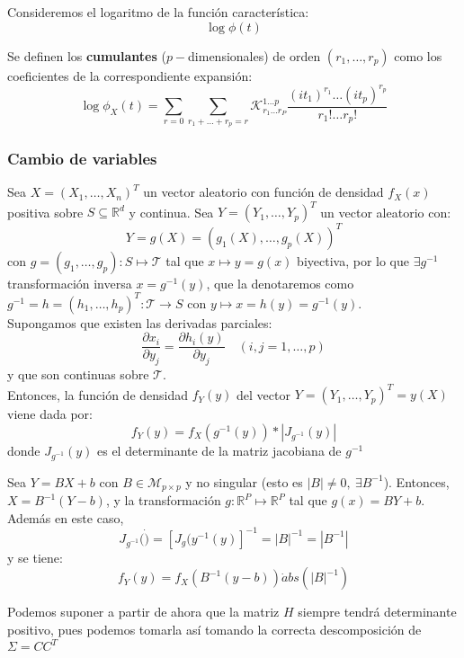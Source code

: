 Consideremos el logaritmo de la función característica:
\[
\log \phi(t)
\]
\begin{ndef}
  Se definen los \textbf{cumulantes} ($p-$dimensionales) de orden $(r_1 , \dots, r_p)$ como los coeficientes de la correspondiente expansión:
  \[
  \log \phi_X(t) =  \sum_{r= 0} \sum_{r_1+\dots + r_p = r} \mathcal K_{r_1 \dots r_P}^{1\dots p} \frac{(it_1)^{r_1} \dots (it_p)^{r_p}}{r_1 ! \dots r_p !}
  \]
\end{ndef}


\subsubsection{Cambio de variables}

\begin{nth}
  Sea $X = (X_1,\dots,X_n)^T$ un vector aleatorio con función de densidad $f_X(x)$ positiva sobre $S \subseteq \mathbb R^d$ y continua. Sea $Y = (Y_1,\dots,Y_p)^T$ un vector aleatorio con:
  \[
  Y = g(X) = (g_1(X),\dots ,g_p(X))^T
  \]
  con $g = (g_1,\dots,g_p): S \mapsto \mathcal T$ tal que $x\mapsto y=g(x)$ biyectiva, por lo que $\exists g^{-1}$ transformación inversa $x = g^{-1}(y)$, que la denotaremos como $g^{-1} = h = (h_1,\dots, h_p)^T : \mathcal T \to S$ con $y \mapsto x =h(y) = g^{-1}(y)$.\\

  Supongamos que existen las derivadas parciales:
  \[
  \frac{\partial x_i}{\partial y_j} = \frac{\partial h_i(y)}{\partial y_j} \quad (i,j = 1,\dots,p)
  \]
  y que son continuas sobre $\mathcal T$.\\

  Entonces, la función de densidad $f_Y(y)$ del vector $Y=(Y_1,\dots,Y_p)^T = y(X)$ viene dada por:
  \[
  f_Y(y) = f_X(g^{-1}(y))*|J_{g^{-1}}(y)|
  \]
  donde $J_{g^{-1}}(y)$ es el determinante de la matriz jacobiana de $g^{-1}$
\end{nth}

\begin{ncor}
  Sea $Y = BX + b$ con $B\in \mathcal M_{p\times p}$ y no singular (esto es $|B|\ne 0, \ \exists B^{-1}$). Entonces, $X = B^{-1}(Y-b)$, y la transformación $g: \mathbb R^P \mapsto \mathbb R^P$ tal que $g(x) = BY+b$. Además en este caso,
  \[
  J_{g^{-1}}(\dot) = [ J_{g}(y^{-1}(y)]^{-1} = |B|^{-1} = |B^{-1}|
  \]
  y se tiene:
  \[
  f_Y(y) = f_X(B^{-1}(y-b))\dot abs(|B|^{-1})
  \]

\end{ncor}
\begin{nota}
Podemos suponer a partir de ahora que la matriz $H$ siempre tendrá determinante positivo, pues podemos tomarla así tomando la correcta descomposición de $\Sigma = CC^T$
  \end{nota}

